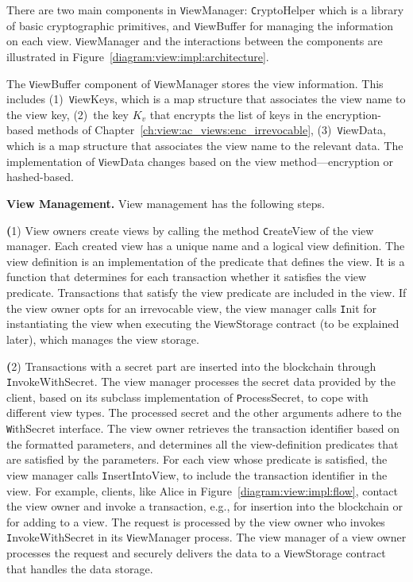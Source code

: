There are two main components in {\texttt ViewManager}: {\texttt CryptoHelper} which is a library of basic cryptographic primitives, and {\texttt ViewBuffer} for managing the information on each view. {\texttt ViewManager} and the interactions between the components are illustrated in Figure~\ref{diagram:view:impl:architecture}. 

The {\texttt ViewBuffer} component of {\texttt ViewManager} stores the view information. This includes (1)~{\texttt ViewKeys}, which is a map structure that associates the view name to the view key, (2)~the key $K_v$ that encrypts the list of keys in the encryption-based methods of Chapter~\ref{ch:view:ac_views:enc_irrevocable}, (3)~{\texttt ViewData}, which is a map structure that associates the view name to the relevant data.
The implementation of {\texttt ViewData} changes based on the view method---encryption or hashed-based.


\smallskip
\noindent
\textbf{View Management.}
View management has the following steps.

\smallskip
\noindent
{\textbf (1)}  View owners create views by calling the method {\texttt CreateView} of the view manager. 
Each created view has a unique name and a logical view definition. The view definition is an implementation of the predicate that defines the view. It is a function that determines for each transaction whether it satisfies the view predicate. Transactions that satisfy the view predicate are included in the view. 
If the view owner opts for an irrevocable view, the view manager calls {\texttt Init} for instantiating the view when executing the {\texttt ViewStorage} contract (to be explained later), which manages the view storage. 

\smallskip
\noindent
{\textbf (2)} Transactions with a secret part are inserted into the blockchain through {\texttt InvokeWithSecret}. The view manager processes the secret data provided by the client, based on its subclass implementation of {\texttt ProcessSecret}, to cope with different view types. The processed secret and the other arguments adhere to the {\texttt WithSecret} interface. The view owner retrieves the transaction identifier based on the formatted parameters, and determines all the view-definition predicates that are satisfied by the parameters. For each view whose predicate is satisfied, the view manager calls {\texttt InsertIntoView}, to include the transaction identifier in the view. For example, clients, like Alice in Figure~\ref{diagram:view:impl:flow}, contact the view owner and invoke a transaction, e.g., for insertion into the blockchain or for adding to a view. The request is processed by the view owner who invokes {\texttt InvokeWithSecret} in its {\texttt ViewManager} process. The view manager of a view owner processes the request and securely delivers the data to a {\texttt ViewStorage} contract that handles the data storage.

